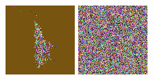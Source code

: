 \documentclass{article}
\begin{document}
\begin{figure}[t]
\begin{minipage}[c]{.21\linewidth}
  \end{minipage}
  \begin{minipage}[c]{.21\linewidth}
    \centering\centerline{\includegraphics[width=\linewidth]{imgs/gens_cal/saxophone/products/0.png}}
  \end{minipage}
  \begin{minipage}[c]{.21\linewidth}
    \centering\centerline{\includegraphics[width=\linewidth]{imgs/gens_cal/stop/products/0.png}}

\end{minipage}
\end{figure}
\end{document}
